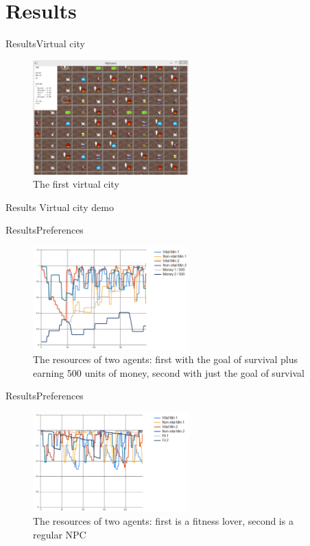 \documentclass{beamer}
\begin{document}
\section{Results}
\begin{textslide}{Results}{Virtual city}{
\begin{figure}
\center
\includegraphics[width=6cm]{Pics/big_city.png}
\caption{The first virtual city}
\label{fig:first_virtual_city}
\end{figure}
}\end{textslide}

\begin{frame}{Results}
\center
\fontsize{18pt}{7.2}\selectfont
Virtual city demo
\end{frame}

\begin{textslide}{Results}{Preferences}{
\begin{figure}
\center
\includegraphics[width=6cm]{Pics/stats_and_money.png}
\caption{The resources of two agents: first with the goal of survival plus earning 500 units of money, second with just the goal of survival}
\label{fig:stats_with_and_without_goal}
\end{figure}
}\end{textslide}

\begin{textslide}{Results}{Preferences}{
\begin{figure}
\center
\includegraphics[width=6cm]{Pics/stats_and_fitness.png}
\caption{The resources of two agents: first is a fitness lover, second is a regular NPC}
\label{fig:stats_by_personality}
\end{figure}
}\end{textslide}
\end{document}
